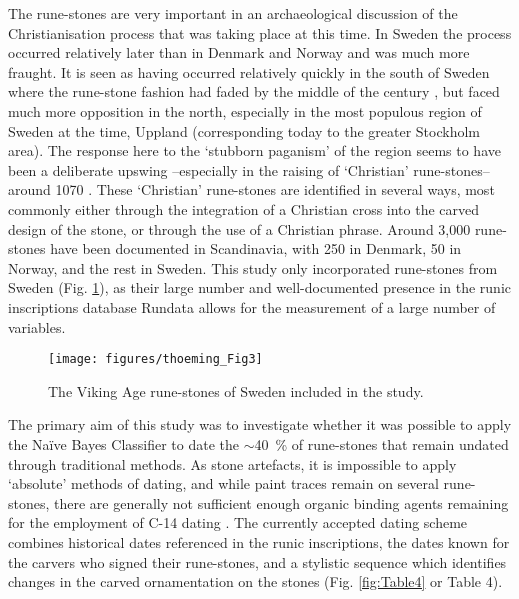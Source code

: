 The rune-stones are very important in an archaeological discussion of the Christianisation process that was taking place at this time. In Sweden the process occurred relatively later than in Denmark and Norway and was much more fraught. It is seen as having occurred relatively quickly in the south of Sweden where the rune-stone fashion had faded by the middle of the  century \parencite[501]{Lager_2010}, but faced much more opposition in the north, especially in the most populous region of Sweden at the time, Uppland (corresponding today to the greater Stockholm area). The response here to the ‘stubborn paganism’ of the region \parencite[39]{Herschend_1994} seems to have been a deliberate upswing –especially in the raising of ‘Christian’ rune-stones– around 1070 \parencite[501]{Lager_2010}. These ‘Christian’ rune-stones are identified in several ways, most commonly either through the integration of a Christian cross into the carved design of the stone, or through the use of a Christian phrase. Around 3,000 rune-stones have been documented in Scandinavia, with \num{250} in Denmark, \num{50} in Norway, and the rest in Sweden. This study only incorporated rune-stones from Sweden (Fig. \ref{fig:Fig3}), as their large number and well-documented presence in the runic inscriptions database Rundata allows for the measurement of a large number of variables.

\begin{figure}[!htb]
	\texttt{[image: figures/thoeming\_Fig3]}
	\centering
	\caption{The Viking Age rune-stones of Sweden included in the study.}
	\label{fig:Fig3}
\end{figure}


The primary aim of this study was to investigate whether it was possible to apply the Naïve Bayes Classifier to date the $\sim$\SI{40}{\percent} of rune-stones that remain undated through traditional methods. As stone artefacts, it is impossible to apply ‘absolute’ methods of dating, and while paint traces remain on several rune-stones, there are generally not sufficient enough organic binding agents remaining for the employment of C-14 dating \parencite[22]{Kitzler_2002}. The currently accepted dating scheme combines historical dates referenced in the runic inscriptions, the dates known for the carvers who signed their rune-stones, and a stylistic sequence which identifies changes in the carved ornamentation on the stones \parencite{Gräslund_2006}(Fig. \ref{fig:Table4} or Table 4).

